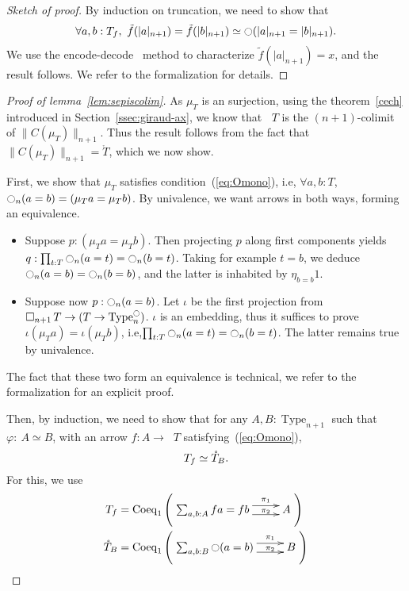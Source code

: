 \documentclass[preprint,9pt,numbers]{sigplanconf}
\makeatletter
\newcommand{\ie}{i.e,\xspace}
\def\dar[#1]#2{\ar@<-#2>[#1]\ar@<#2>[#1]} %
\DeclareMathOperator{\Type}{Type}
\newcommand{\modal}{\ensuremath{\ocircle}}
\newcommand \separated {\mathop{\square_{n+1}} }
\newenvironment{mymath}[1][-0em]{%
  \newcommand\mymathaux{\vspace{#1}}%
  \vspace{#1}%
  \begin{equation*}%
  }{ %
    \mymathaux%
  \end{equation*}}
\makeatother
\begin{document}
\begin{proof}[Sketch of proof]
  By induction on truncation, we need to show that 
  \begin{mymath}\forall a,b:T_f,~\tilde f (|a|_{n+1}) = \tilde f (|b|_{n+1} )\simeq
  \modal (|a|_{n+1}=|b|_{n+1}).\end{mymath}%
  We use the encode-decode~\cite[Section 8.9]{hottbook} method to characterize $\tilde f (|a|_{n+1})
  = x$, and the result follows. We refer to the formalization for details.
\end{proof}

\begin{proof}[Proof of lemma~\ref{lem:sepiscolim}]
  As $\mu_T$ is an surjection, using the theorem~\ref{cech} introduced in Section~\ref{ssec:giraud-ax},
  we know that $\separated T$ is the $(n+1)$-colimit of $\|C(\mu_T)\|_{n+1}$. 
  Thus the result follows from the fact that $\|C(\mu_T)\|_{n+1} =
  \mathring T$,
  which we now show.

  First, we show that $\mu_T$ satisfies condition~(\ref{eq:Omono}),
  \ie{} $\forall a,b:T$, $\modal_n (a=b) = (\mu_T a =
  \mu_T b)$. By univalence, we want arrows in both ways, forming an
  equivalence.
  \begin{itemize}
  \item Suppose $p : (\mu_T a = \mu_T b)$. Then projecting $p$ along
    first components yields $q : \prod_{t:T} \modal_n(a=t) = \modal_n (b=t)
    $.
    Taking for example $t=b$, we deduce $\modal_n (a=b) = \modal_n(b=b)$,
    and the latter is inhabited by $\eta_{b=b} 1$.
  \item Suppose now $p : \modal_n(a=b)$. Let $\iota$ be the first
    projection from $\separated T \to (T \to \Type_n^\modal)$. $\iota$ is
    an embedding, thus it suffices to prove $\iota (\mu_T a) = \iota
    (\mu_T b)$, \ie $\prod_{t:T}\modal_n (a=t) = \modal_n (b=t)$. The latter
    remains true by univalence.
  \end{itemize}
  The fact that these two form an equivalence is technical, we refer to
  the formalization for an explicit proof.

  Then, by induction, we need to show that for any $A,B:\Type_{n+1}$ such
  that $\varphi:~A \simeq B$, with an arrow $f:A \to \separated T$
  satisfying~(\ref{eq:Omono}), 
  \begin{mymath}T_f \simeq \mathring T_B.\end{mymath}%
  For this, we use 
  \begin{align*}
    T_f &= \mathrm{Coeq}_1 \left( 
          \xymatrix{
          \sum_{a,b:A} f a = f b \dar[r]{4pt}^-{\pi_1}_-{\pi_2} & A
  }
                                                                  \right)
    \\
    \mathring T_B &= \mathrm{Coeq}_1 \left( 
                    \xymatrix{\sum_{a,b:B} \modal (a=b) \dar[r]{4pt}^-{\pi_1}_-{\pi_2}
                                                                & B}
                                                                  \right)
  \end{align*}


\end{proof}
\end{document}
